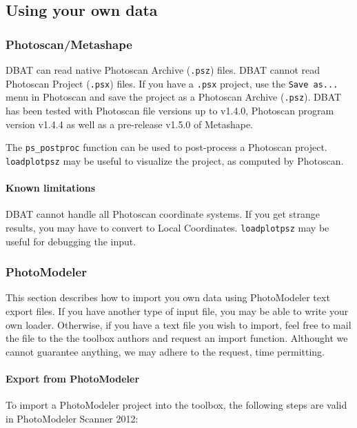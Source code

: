 \documentclass{article}
\begin{document}
\newpage
\subsection{Using your own data}

\subsubsection{Photoscan/Metashape}

DBAT can read native Photoscan Archive (\verb+.psz+) files. DBAT
cannot read Photoscan Project (\verb+.psx+) files. If you have a
\verb+.psx+ project, use the \verb+Save as...+ menu in Photoscan and
save the project as a Photoscan Archive (\verb+.psz+). DBAT has been
tested with Photoscan file versions up to v1.4.0, Photoscan program
version v1.4.4 as well as a pre-release v1.5.0 of Metashape.

The \verb+ps_postproc+ function can be used to post-process a
Photoscan project. \verb+loadplotpsz+ may be useful to visualize the
project, as computed by Photoscan.

\paragraph{Known limitations}

DBAT cannot handle all Photoscan coordinate systems. If you get
strange results, you may have to convert to Local Coordinates. \verb+loadplotpsz+ may be useful for debugging the input.

\subsubsection{PhotoModeler}

This section describes how to import you own data using PhotoModeler
text export files. If you have another type of input file, you may be
able to write your own loader. Otherwise, if you have a text file you
wish to import, feel free to mail the file to the the toolbox authors
and request an import function. Althought we cannot guarantee
anything, we may adhere to the request, time permitting.

\paragraph{Export from PhotoModeler}

To import a PhotoModeler project into the toolbox, the following
steps are valid in PhotoModeler Scanner 2012:
\end{document}

